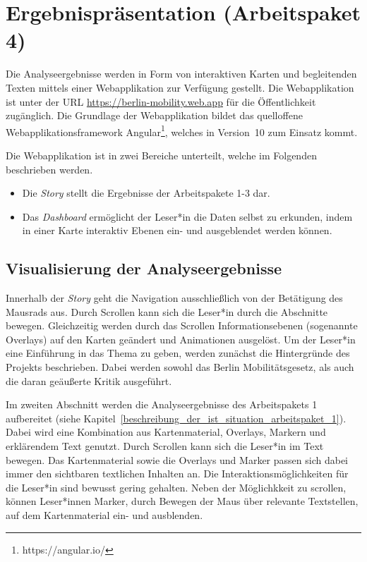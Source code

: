 \newpage

\section{Ergebnispräsentation (Arbeitspaket 4)}
\label{ergebnispraesentation}

Die Analyseergebnisse werden in Form von interaktiven Karten und begleitenden Texten mittels einer Webapplikation zur Verfügung gestellt. Die Webapplikation ist unter der URL \url{https://berlin-mobility.web.app} für die Öffentlichkeit zugänglich. Die Grundlage der Webapplikation bildet das quelloffene Webapplikationsframework Angular\footnote{https://angular.io/}, welches in Version~10 zum Einsatz kommt.


Die Webapplikation ist in zwei Bereiche unterteilt, welche im Folgenden beschrieben werden.

\begin{itemize}
    \item Die \emph{Story} stellt die Ergebnisse der Arbeitspakete 1-3 dar.
    \item Das \emph{Dashboard} ermöglicht der Leser*in die Daten selbst zu erkunden, indem in einer Karte interaktiv Ebenen ein- und ausgeblendet werden können.
\end{itemize}

\subsection{Visualisierung der Analyseergebnisse}
\label{visualisierung_der_analyseergebnisse}

Innerhalb der \emph{Story} geht die Navigation ausschließlich von der Betätigung des Mausrads aus. Durch Scrollen kann sich die Leser*in durch die Abschnitte bewegen. Gleichzeitig werden durch das Scrollen Informationsebenen (sogenannte Overlays) auf den Karten geändert und Animationen ausgelöst. Um der Leser*in eine Einführung in das Thema zu geben, werden zunächst die Hintergründe des Projekts beschrieben. Dabei werden sowohl das Berlin Mobilitätsgesetz, als auch die daran geäußerte Kritik ausgeführt.

Im zweiten Abschnitt werden die Analyseergebnisse des Arbeitspakets 1 aufbereitet (siehe Kapitel~\ref{beschreibung_der_ist_situation_arbeitspaket_1}). Dabei wird eine Kombination aus Kartenmaterial, Overlays, Markern und erklärendem Text genutzt. Durch Scrollen kann sich die Leser*in im Text bewegen. Das Kartenmaterial sowie die Overlays und Marker passen sich dabei immer den sichtbaren textlichen Inhalten an. Die Interaktionsmöglichkeiten für die Leser*in sind bewusst gering gehalten. Neben der Möglichkkeit zu scrollen, können Leser*innen Marker, durch Bewegen der Maus über relevante Textstellen, auf dem Kartenmaterial ein- und ausblenden.

